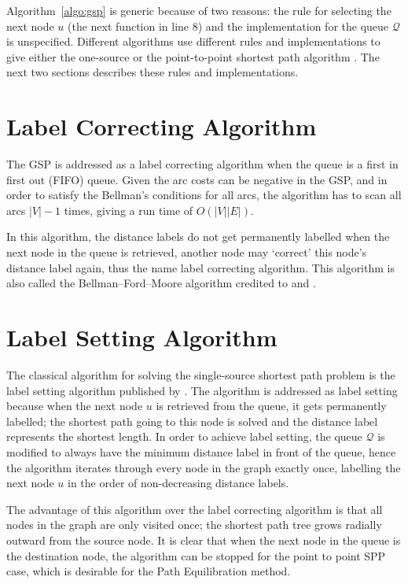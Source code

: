 Algorithm~\ref{algo:gsp} is generic because of two reasons:
the rule for selecting the next node $u$ (the next function in line 8) and
the implementation for the queue $\mathcal{Q}$ is unspecified.
Different algorithms use different rules and implementations to give 
either the one-source or the point-to-point shortest path algorithm \citep{mplomer}.
The next two sections describes these rules and implementations.

\section{Label Correcting Algorithm}
\label{section:labelcorrectingalgorithm}
The GSP is addressed as a label correcting algorithm when the queue is a first in first out (FIFO) queue.
Given the arc costs can be negative in the GSP,
and in order to satisfy the Bellman's conditions for all arcs,
the algorithm has to scan all arcs $|V|-1$ times,
giving a run time of $O(|V||E|)$.

In this algorithm,
the distance labels do not get permanently labelled when the next node in the queue is retrieved,
another node may `correct' this node's distance label again,
thus the name label correcting algorithm.
This algorithm is also called the Bellman–Ford–Moore algorithm credited to \citet{Bellman, Ford} and \citet{Moore}.

\section{Label Setting Algorithm}
\label{section:labelsettingalgorithm}
The classical algorithm for solving the single-source shortest path problem is the label setting algorithm published by \citet{Dijkstra}.
The algorithm is addressed as label setting because when the next node $u$ is retrieved from the queue,
it gets permanently labelled;
the shortest path going to this node is solved and 
the distance label represents the shortest length.
In order to achieve label setting, 
the queue $\mathcal{Q}$ is modified to always have the minimum distance label in front of the queue,
hence the algorithm iterates through every node in the graph exactly once,
labelling the next node $u$ in the order of non-decreasing distance labels.

The advantage of this algorithm over the label correcting algorithm is
that all nodes in the graph are only visited once;
the shortest path tree grows radially outward from the source node.
It is clear that when the next node in the queue is the destination node,
the algorithm can be stopped for the point to point SPP case,
which is desirable for the Path Equilibration method.

